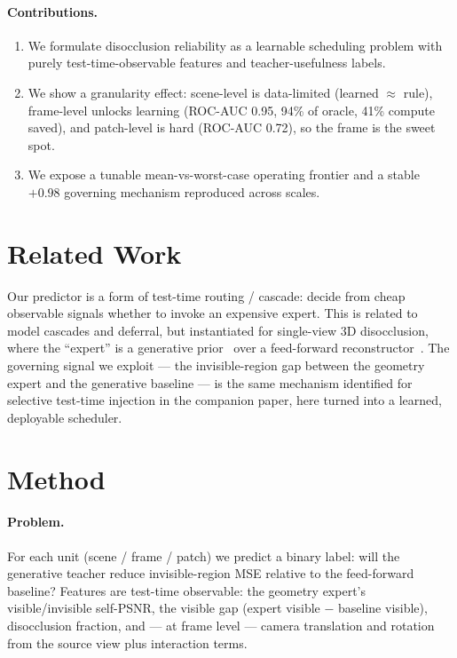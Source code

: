 \documentclass[10pt,twocolumn,letterpaper]{article}
\begin{document}
\paragraph{Contributions.}
\begin{enumerate}
\item We formulate disocclusion reliability as a learnable scheduling problem
with purely test-time-observable features and teacher-usefulness labels.
\item We show a granularity effect: scene-level is data-limited (learned $\approx$
rule), frame-level unlocks learning (ROC-AUC 0.95, 94\% of oracle, 41\% compute
saved), and patch-level is hard (ROC-AUC 0.72), so the frame is the sweet spot.
\item We expose a tunable mean-vs-worst-case operating frontier and a stable
$+0.98$ governing mechanism reproduced across scales.
\end{enumerate}

\section{Related Work}
\label{sec:related}
Our predictor is a form of test-time routing / cascade: decide from cheap
observable signals whether to invoke an expensive expert. This is related to
model cascades and deferral, but instantiated for single-view 3D disocclusion,
where the ``expert'' is a generative prior~\cite{viewcrafter,cat3d,genwarp} over
a feed-forward reconstructor~\cite{flash3d,pixelsplat,mvsplat,depthsplat}. The
governing signal we exploit --- the invisible-region gap between the geometry
expert and the generative baseline --- is the same mechanism identified for
selective test-time injection in the companion paper, here turned into a learned,
deployable scheduler.

\section{Method}
\label{sec:method}
\paragraph{Problem.} For each unit (scene / frame / patch) we predict a binary
label: will the generative teacher reduce invisible-region MSE relative to the
feed-forward baseline? Features are test-time observable: the geometry expert's
visible/invisible self-PSNR, the visible gap (expert visible $-$ baseline
visible), disocclusion fraction, and --- at frame level --- camera translation
and rotation from the source view plus interaction terms.
\end{document}
